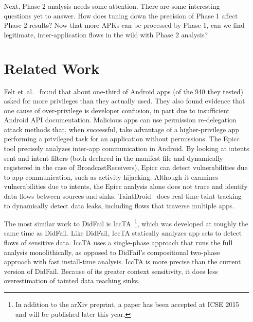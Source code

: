 Next, Phase 2 analysis needs some attention. There are some interesting questions yet to answer. How does tuning down the precision of Phase 1 affect Phase 2 results?  Now that more APKs can be processed by Phase 1, can we find legitimate, inter-application flows in the wild with Phase 2 analysis?

\chapter{Related Work}
Felt et\ al.~\cite{felt2011android} found that about one-third of Android apps (of the 940 they tested) asked for more privileges than they actually used. They also found evidence that one cause of over-privilege is developer confusion, in part due to insufficient Android API documentation. Malicious apps can use permission re-delegation attack methods \cite{felt2011permission} that, when successful, take advantage of a higher-privilege app performing a privileged task for an application without permissions. The Epicc \cite{epicc} tool precisely analyzes inter-app communication in Android.  By looking at intents sent and intent filters (both declared in the manifest file and  dynamically registered in the case of BroadcastReceivers), Epicc can detect vulnerabilities due to app communication, such as activity hijacking. Although it examines vulnerabilities due to intents, the Epicc analysis alone does not trace and identify data flows between sources and sinks. 
TaintDroid~\cite{enck2010taintdroid} does real-time taint tracking to dynamically detect data leaks, including flows that traverse multiple apps.

The most similar work to DidFail is IccTA~\cite{li2014know}\footnote{In addition to the arXiv preprint, a paper has been accepted at ICSE 2015 and will be published later this year.}, which was developed at roughly the same time as DidFail.  Like DidFail, IccTA statically analyzes app sets to detect flows of sensitive data. IccTA uses a single-phase approach that runs the full analysis monolithically, as opposed to DidFail's compositional two-phase approach with fast install-time analysis. IccTA is more precise than the current version of DidFail. Because of its greater context sensitivity, it does less overestimation of tainted data reaching sinks.

